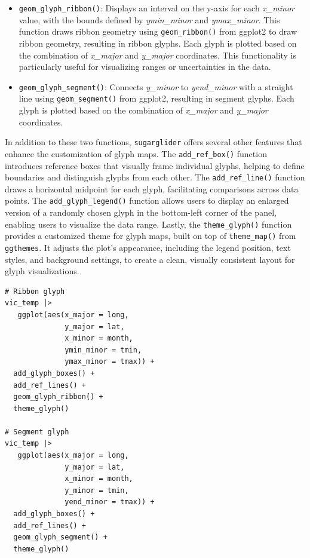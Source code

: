 \begin{itemize}
\item
  \texttt{geom\_glyph\_ribbon()}: Displays an interval on the y-axis for each \emph{x\_minor} value, with the bounds defined by \emph{ymin\_minor} and \emph{ymax\_minor}. This function draws ribbon geometry using \texttt{geom\_ribbon()} from ggplot2 to draw ribbon geometry, resulting in ribbon glyphs. Each glyph is plotted based on the combination of \emph{x\_major} and \emph{y\_major} coordinates. This functionality is particularly useful for visualizing ranges or uncertainties in the data.
\item
  \texttt{geom\_glyph\_segment()}: Connects \emph{y\_minor} to \emph{yend\_minor} with a straight line using \texttt{geom\_segment()} from ggplot2, resulting in segment glyphs. Each glyph is plotted based on the combination of \emph{x\_major} and \emph{y\_major} coordinates.
\end{itemize}

In addition to these two functions, \texttt{sugarglider} offers several other features that enhance the customization of glyph maps. The \texttt{add\_ref\_box()} function introduces reference boxes that visually frame individual glyphs, helping to define boundaries and distinguish glyphs from each other. The \texttt{add\_ref\_line()} function draws a horizontal midpoint for each glyph, facilitating comparisons across data points. The \texttt{add\_glyph\_legend()} function allows users to display an enlarged version of a randomly chosen glyph in the bottom-left corner of the panel, enabling users to visualize the data range. Lastly, the \texttt{theme\_glyph()} function provides a customized theme for glyph maps, built on top of \texttt{theme\_map()} from \texttt{ggthemes}. It adjusts the plot's appearance, including the legend position, text styles, and background settings, to create a clean, visually consistent layout for glyph visualizations.

\begin{verbatim}
# Ribbon glyph
vic_temp |>
   ggplot(aes(x_major = long,
              y_major = lat,
              x_minor = month,
              ymin_minor = tmin,
              ymax_minor = tmax)) +
  add_glyph_boxes() +
  add_ref_lines() +
  geom_glyph_ribbon() +
  theme_glyph()

# Segment glyph
vic_temp |>
   ggplot(aes(x_major = long,
              y_major = lat,
              x_minor = month,
              y_minor = tmin,
              yend_minor = tmax)) +
  add_glyph_boxes() +
  add_ref_lines() +
  geom_glyph_segment() +
  theme_glyph()
\end{verbatim}

